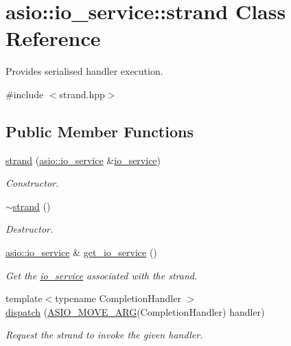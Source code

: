 \hypertarget{classasio_1_1io__service_1_1strand}{}\section{asio\+:\+:io\+\_\+service\+:\+:strand Class Reference}
\label{classasio_1_1io__service_1_1strand}


Provides serialised handler execution.  




{\ttfamily \#include $<$strand.\+hpp$>$}

\subsection*{Public Member Functions}
\begin{DoxyCompactItemize}
\item 
\hyperlink{classasio_1_1io__service_1_1strand_a8f06eed4e6699a26bfcfdbd2feb1b7ff}{strand} (\hyperlink{classasio_1_1io__service}{asio\+::io\+\_\+service} \&\hyperlink{classasio_1_1io__service}{io\+\_\+service})
\begin{DoxyCompactList}\small\item\em Constructor. \end{DoxyCompactList}\item 
\hyperlink{classasio_1_1io__service_1_1strand_a798ddf5fc35c7ca14ff3d2be0bf8dfee}{$\sim$strand} ()
\begin{DoxyCompactList}\small\item\em Destructor. \end{DoxyCompactList}\item 
\hyperlink{classasio_1_1io__service}{asio\+::io\+\_\+service} \& \hyperlink{classasio_1_1io__service_1_1strand_a8fd9a2fd5a257cb39e60532d0fc42405}{get\+\_\+io\+\_\+service} ()
\begin{DoxyCompactList}\small\item\em Get the \hyperlink{classasio_1_1io__service}{io\+\_\+service} associated with the strand. \end{DoxyCompactList}\item 
{\footnotesize template$<$typename Completion\+Handler $>$ }\\\hyperlink{classasio_1_1io__service_1_1strand_a4191e0faa4dc731cda5a68cdd0a236e6}{dispatch} (\hyperlink{group__async__read_ga6d72a97784dde9476c6d93b8904a4967}{A\+S\+I\+O\+\_\+\+M\+O\+V\+E\+\_\+\+A\+R\+G}(Completion\+Handler) handler)
\begin{DoxyCompactList}\small\item\em Request the strand to invoke the given handler. \end{DoxyCompactList}\item 

\end{DoxyCompactItemize}
